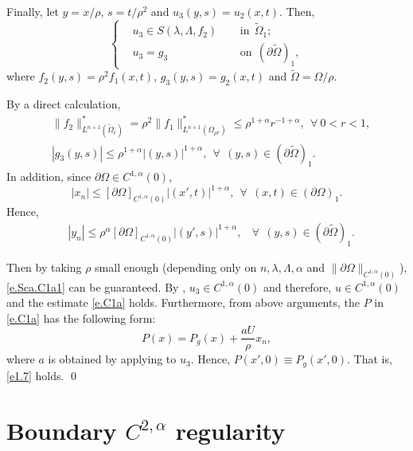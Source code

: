 \documentclass[preprint,12pt]{elsarticle}
\theoremstyle{definition}
\theoremstyle{remark}
\numberwithin{equation}{section}
\begin{document}
Finally, let $y=x/\rho$, $s=t/\rho^2$ and $u_3(y,s)=u_2(x,t)$. Then,
\begin{equation*}
\left\{\begin{aligned}
&u_3\in S(\lambda,\Lambda,f_2)&& ~~\mbox{in}~~\tilde \Omega_1;\\
&u_3=g_3&& ~~\mbox{on}~~(\partial \tilde \Omega)_1,
\end{aligned}\right.
\end{equation*}
where $f_2(y,s)=\rho^2f_1(x,t)$, $g_3(y,s)=g_2(x,t)$ and $\tilde{\Omega}=\Omega/\rho$.

By a direct calculation,
\begin{equation*}
  \begin{aligned}
    &\|f_2\|^*_{L^{n+1}(\tilde{\Omega}_r)}=\rho^2\|f_1\|^*_{L^{n+1}(\Omega_{\rho r})}
    \leq \rho^{1+\alpha} r^{-1+\alpha},~~\forall ~0<r<1,\\
    &|g_3(y,s)|\leq \rho^{1+\alpha}|(y,s)|^{1+\alpha},~~\forall~~(y,s)\in(\partial \tilde\Omega)_1.
  \end{aligned}
\end{equation*}
In addition, since $\partial \Omega \in C^{1,\alpha}(0)$,
\begin{equation*}
  |x_n|\leq [\partial \Omega]_{C^{1,\alpha}(0)}|(x',t)|^{1+\alpha},~~\forall~~(x,t)\in(\partial \Omega)_1.
\end{equation*}
Hence,
\begin{equation*}
  \begin{aligned}
    &|y_n|\leq \rho^{\alpha}[\partial \Omega]_{C^{1,\alpha}(0)}|(y',s)|^{1+\alpha},
    ~~~~\forall~~(y,s)\in (\partial\tilde{\Omega})_1.
  \end{aligned}
\end{equation*}

Then by taking $\rho$ small enough (depending only on $n,\lambda,\Lambda,\alpha$ and $\|\partial \Omega\|_{C^{1,\alpha}(0)}$), \cref{e.Sca.C1a1} can be guaranteed. By , $u_3 \in C^{1,\alpha}(0)$ and therefore, $u\in C^{1,\alpha}(0)$ and the estimate \cref{e.C1a} holds. Furthermore, from above arguments, the $P$ in \cref{e.C1a} has the following form:
\begin{equation*}
P(x)=P_g(x)+\frac{aU}{\rho} x_n,
\end{equation*}
where $a$ is obtained by applying  to $u_3$. Hence, $P(x',0)\equiv P_g(x',0)$. That is, \cref{e1.7} holds. \qed~\\

\section{Boundary $C^{2,\alpha}$ regularity}\label{sec:C2a}
\end{document}
